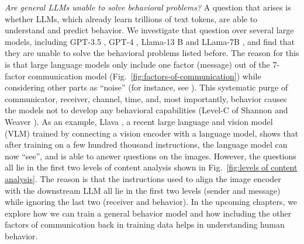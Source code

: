 \textit{Are general LLMs unable to solve behavioral problems?} A question that arises is whether LLMs, which already learn trillions of text tokens, are able to understand and predict behavior. We investigate that question over several large models, including GPT-3.5 \cite{brown2020language}, GPT-4 \cite{openai2023gpt4}, Llama-13 B and LLama-7B \cite{touvron2023llama}, and find that they are unable to solve the behavioral problems listed before. The reason for this is that large language models only include one factor (message) out of the 7-factor communication model (Fig.~\ref{fig:factors-of-communication}) while considering other parts as ``noise'' (for instance, see \cite{biderman2022datasheet,penedo2023refinedweb}). This systematic purge of communicator, receiver, channel, time, and, most importantly, behavior causes the models not to develop any behavioral capabilities (Level-C of Shannon and Weaver \cite{shannon-weaver-1949}). As an example, Llava \cite{liu2023visual}, a recent large language and vision model (VLM) trained by connecting a vision encoder with a language model, shows that after training on a few hundred thousand instructions, the language model can now ``see'', and is able to answer questions on the images. However, the questions all lie in the first two levels of content analysis shown in Fig.~\ref{fig:levels of content analysis}. The reason is that the instructions used to align the image encoder with the downstream LLM all lie in the first two levels (sender and message) while ignoring the last two (receiver and behavior). In the upcoming chapters, we explore how we can train a general behavior model and how including the other factors of communication back in training data helps in understanding human behavior.








